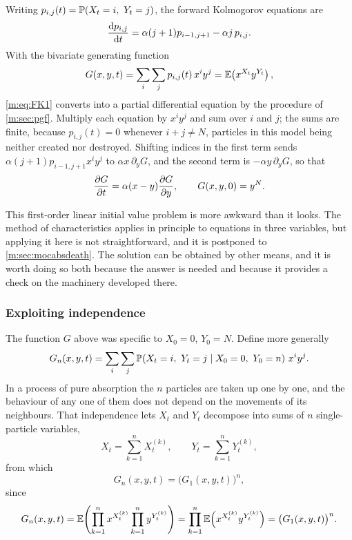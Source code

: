 Writing $p_{i,j}(t) = \pr{X_t=i,\ Y_t=j}$, the forward Kolmogorov equations are
\begin{equation}
\label{m:eq:FK1}
\frac{\mathrm{d} p_{i,j}}{\mathrm{d} t} = \alpha(j+1)p_{i-1,j+1} - \alpha j\,p_{i,j} .
\end{equation}
With the bivariate generating function
\begin{equation}
\label{m:eq:pgfDef}
G(x,y,t) = \sum_i\sum_j p_{i,j}(t)\,x^iy^j = \mathbb{E}\!\left(x^{X_t}y^{Y_t}\right),
\end{equation}
\cref{m:eq:FK1} converts into a partial differential equation by the procedure of
\cref{m:sec:pgf}. Multiply each equation by $x^iy^j$ and sum over $i$ and $j$; the
sums are finite, because $p_{i,j}(t)=0$ whenever $i+j\neq N$, particles in this
model being neither created nor destroyed. Shifting indices in the first term
sends $\alpha(j+1)p_{i-1,j+1}x^iy^j$ to $\alpha x\,\partial_yG$, and the second
term is $-\alpha y\,\partial_yG$, so that
\begin{equation}
\label{m:eq:PDE1}
\frac{\partial G}{\partial t} = \alpha(x-y)\frac{\partial G}{\partial y},
\qquad G(x,y,0) = y^N .
\end{equation}

This first-order linear initial value problem is more awkward than it looks. The
method of characteristics applies in principle to equations in three variables, but
applying it here is not straightforward, and it is postponed to
\cref{m:sec:mocabsdeath}. The solution can be obtained by other means, and it is
worth doing so both because the answer is needed and because it provides a check on
the machinery developed there.

\subsubsection*{Exploiting independence}

The function $G$ above was specific to $X_0=0$, $Y_0=N$. Define more generally
\begin{equation*}
G_n(x,y,t) = \sum_i\sum_j\mathbb{P}\!\left(X_t=i,\ Y_t=j \mid X_0=0,\ Y_0=n\right)\,x^iy^j .
\end{equation*}
In a process of pure absorption the $n$ particles are taken up one by one, and the
behaviour of any one of them does not depend on the movements of its neighbours.
That independence lets $X_t$ and $Y_t$ decompose into sums of $n$ single-particle
variables,
\begin{equation*}
X_t = \sum_{k=1}^{n}X_t^{(k)},
\qquad
Y_t = \sum_{k=1}^{n}Y_t^{(k)},
\end{equation*}
from which
\begin{equation}
\label{m:eq:indRelPGF}
G_n(x,y,t) = \bigl(G_1(x,y,t)\bigr)^n ,
\end{equation}
since
\begin{equation*}
G_n(x,y,t)
= \mathbb{E}\!\left(\prod_{k=1}^{n}x^{X_t^{(k)}}\prod_{k=1}^{n}y^{Y_t^{(k)}}\right)
= \prod_{k=1}^{n}\mathbb{E}\!\left(x^{X_t^{(k)}}y^{Y_t^{(k)}}\right)
= \bigl(G_1(x,y,t)\bigr)^n .
\end{equation*}

